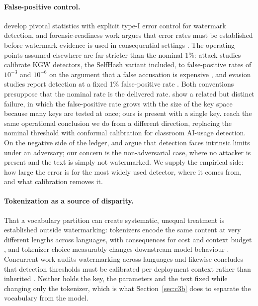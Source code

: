\documentclass[conference]{IEEEtran}
\begin{document}
\paragraph{False-positive control.}
\citet{li2024statistical} develop pivotal statistics with explicit type-I error
control for watermark detection, and forensic-readiness work argues that error
rates must be established before watermark evidence is used in consequential
settings \citep{tamim2026forensic}. The operating points assumed elsewhere are
far stricter than the nominal 1\%: attack studies calibrate KGW detectors, the
SelfHash variant included, to false-positive rates of $10^{-3}$ and $10^{-6}$ on
the argument that a false accusation is expensive \citep{jovanovic2024stealing},
and evasion studies report detection at a fixed 1\% false-positive rate
\citep{krishna2023paraphrasing}. Both conventions presuppose that the nominal
rate is the delivered rate. \citet{fu2025multiuse} show a related but distinct
failure, in which the false-positive rate grows with the size of the key space
because many keys are tested at once; ours is present with a single key.
\citet{xie2025classroom} reach the same operational conclusion we do from a
different direction, replacing the nominal threshold with conformal calibration
for classroom AI-usage detection. On the negative side of the ledger,
\citet{sadasivan2025reliably} and \citet{pang2024nofreelunch} argue that detection
faces intrinsic limits under an adversary; our concern is the non-adversarial
case, where no attacker is present and the text is simply not watermarked. We supply the empirical side: how large the error is
for the most widely used detector, where it comes from, and what calibration
removes it.

\paragraph{Tokenization as a source of disparity.}
That a vocabulary partition can create systematic, unequal treatment is
established outside watermarking: tokenizers encode the same content at very
different lengths across languages, with consequences for cost and context budget
\citep{petrov2023tokenizers,ahia2023cost}, and tokenizer choice measurably changes
downstream model behaviour \citep{ali2024tokenizer}. Concurrent work audits watermarking across
languages and likewise concludes that detection thresholds must be calibrated per
deployment context rather than inherited \citep{nemecek2026crosslingual}. Neither
holds the key, the parameters and the text fixed while changing only the
tokenizer, which is what Section~\ref{sec:c3b} does to separate the vocabulary
from the model.
\end{document}
